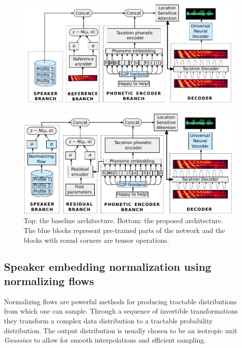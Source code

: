 \begin{figure}[h!]
	\centering

	\includegraphics[width=1.0\linewidth]{tts/images/baseline_architecture}

	\vspace{0.5cm}

	\includegraphics[width=1.0\linewidth]{tts/images/proposed_architecture}

	\caption{Top: the baseline architecture. Bottom: the proposed architecture. The blue blocks represent pre-trained parts of the network and the blocks with round corners are tensor operations.}
	\label{fig:architectures}
\end{figure}


\subsection{Speaker embedding normalization using normalizing flows}
Normalizing flows \autocite{rezende2015} are powerful methods for producing tractable distributions from which one can sample. Through a sequence of invertible transformations they transform a complex data distribution to a tractable probability distribution. The output distribution is usually chosen to be an isotropic unit \textit{Gaussian} to allow for smooth interpolations and efficient sampling.

